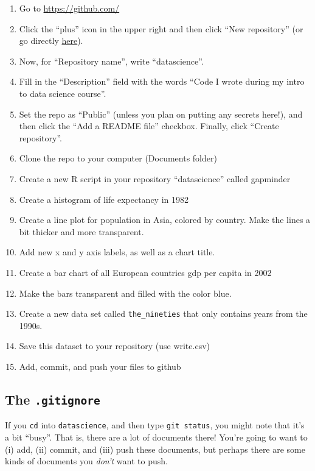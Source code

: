 \documentclass[
]{book}
\begin{document}
\begin{enumerate}
\def\labelenumi{\arabic{enumi})}
\item
  Go to \url{https://github.com/}
\item
  Click the ``plus'' icon in the upper right and then click ``New repository'' (or go directly \href{https://github.com/new}{here}).
\item
  Now, for ``Repository name'', write ``datascience''.
\item
  Fill in the ``Description'' field with the words ``Code I wrote during my intro to data science course''.
\item
  Set the repo as ``Public'' (unless you plan on putting any secrets here!), and then click the ``Add a README file'' checkbox. Finally, click ``Create repository''.
\item
  Clone the repo to your computer (Documents folder)
\item
  Create a new R script in your repository ``datascience'' called gapminder
\item
  Create a histogram of life expectancy in 1982
\item
  Create a line plot for population in Asia, colored by country. Make the lines a bit thicker and more transparent.
\item
  Add new x and y axis labels, as well as a chart title.
\item
  Create a bar chart of all European countries gdp per capita in 2002
\item
  Make the bars transparent and filled with the color blue.
\item
  Create a new data set called \texttt{the\_nineties} that only contains years from the 1990s.
\item
  Save this dataset to your repository (use write.csv)
\item
  Add, commit, and push your files to github
\end{enumerate}

\hypertarget{the-.gitignore}{%
\subsection*{\texorpdfstring{The \texttt{.gitignore}}{The .gitignore}}\label{the-.gitignore}}

If you \texttt{cd} into \texttt{datascience}, and then type \texttt{git\ status}, you might note that it's a bit ``busy''. That is, there are a lot of documents there! You're going to want to (i) add, (ii) commit, and (iii) push these documents, but perhaps there are some kinds of documents you \emph{don't} want to push.
\end{document}
